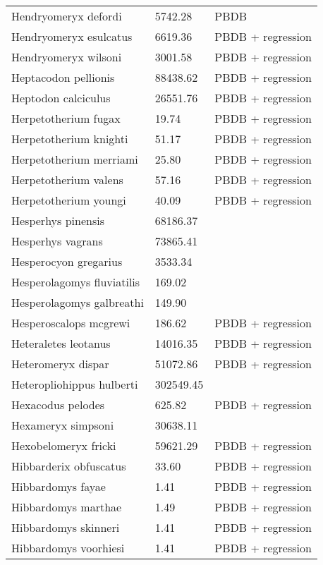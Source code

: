\documentclass{article}
\begin{document}
\begin{center}
\begin{longtable}{p{} p{} p{}}
    Hendryomeryx defordi & 5742.28 & PBDB \\ 
    Hendryomeryx esulcatus & 6619.36 & PBDB + regression \\ 
    Hendryomeryx wilsoni & 3001.58 & PBDB + regression \\ 
    Heptacodon pellionis & 88438.62 & PBDB + regression \\ 
    Heptodon calciculus & 26551.76 & PBDB + regression \\ 
    Herpetotherium fugax & 19.74 & PBDB + regression \\ 
    Herpetotherium knighti & 51.17 & PBDB + regression \\ 
    Herpetotherium merriami & 25.80 & PBDB + regression \\ 
    Herpetotherium valens & 57.16 & PBDB + regression \\ 
    Herpetotherium youngi & 40.09 & PBDB + regression \\ 
    Hesperhys pinensis & 68186.37 & \cite{Tomiya2013} \\ 
    Hesperhys vagrans & 73865.41 & \cite{Tomiya2013} \\ 
    Hesperocyon gregarius & 3533.34 & \cite{Tomiya2013} \\ 
    Hesperolagomys fluviatilis & 169.02 & \cite{Tomiya2013} \\ 
    Hesperolagomys galbreathi & 149.90 & \cite{Tomiya2013} \\ 
    Hesperoscalops mcgrewi & 186.62 & PBDB + regression \\ 
    Heteraletes leotanus & 14016.35 & PBDB + regression \\ 
    Heteromeryx dispar & 51072.86 & PBDB + regression \\ 
    Heteropliohippus hulberti & 302549.45 & \cite{Tomiya2013} \\ 
    Hexacodus pelodes & 625.82 & PBDB + regression \\ 
    Hexameryx simpsoni & 30638.11 & \cite{Tomiya2013} \\ 
    Hexobelomeryx fricki & 59621.29 & PBDB + regression \\ 
    Hibbarderix obfuscatus & 33.60 & PBDB + regression \\ 
    Hibbardomys fayae & 1.41 & PBDB + regression \\ 
    Hibbardomys marthae & 1.49 & PBDB + regression \\ 
    Hibbardomys skinneri & 1.41 & PBDB + regression \\ 
    Hibbardomys voorhiesi & 1.41 & PBDB + regression \\ 

\end{longtable}
\end{center}
\end{document}

